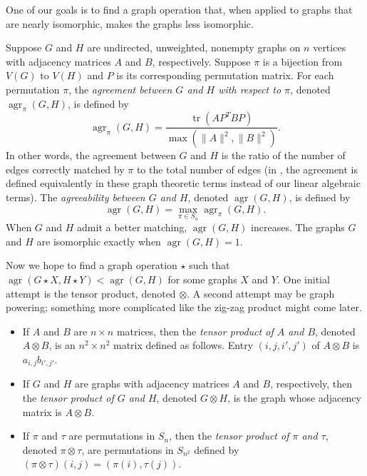 \documentclass{article}
\newcommand{\1}{\mathbf{1}}
\DeclareMathOperator{\tr}{tr}
\DeclareMathOperator{\agr}{agr}
\begin{document}
One of our goals is to find a graph operation that, when applied to graphs that are nearly isomorphic, makes the graphs less isomorphic.

Suppose $G$ and $H$ are undirected, unweighted, nonempty graphs on $n$ vertices with adjacency matrices $A$ and $B$, respectively.
Suppose $\pi$ is a bijection from $V(G)$ to $V(H)$ and $P$ is its corresponding permutation matrix.
For each permutation $\pi$, the \emph{agreement between $G$ and $H$ with respect to $\pi$}, denoted $\agr_\pi(G, H)$, is defined by
\begin{equation*}
  \agr_\pi(G, H) = \frac{\tr(AP^TBP)}{\max(\|A\|^2, \|B\|^2)}.
\end{equation*}
In other words, the agreement between $G$ and $H$ is the ratio of the number of edges correctly matched by $\pi$ to the total number of edges (in \autocite{owwz14}, the agreement is defined equivalently in these graph theoretic terms instead of our linear algebraic terms).
The \emph{agreeability between $G$ and $H$}, denoted $\agr(G, H)$, is defined by
\begin{equation*}
  \agr(G, H) = \max_{\pi \in S_n} \agr_\pi(G, H).
\end{equation*}
When $G$ and $H$ admit a better matching, $\agr(G, H)$ increases.
The graphs $G$ and $H$ are isomorphic exactly when $\agr(G, H) = 1$.

Now we hope to find a graph operation $\star$ such that $\agr(G \star X, H \star Y) < \agr(G, H)$ for some graphs $X$ and $Y$.
One initial attempt is the tensor product, denoted $\otimes$.
A second attempt may be graph powering; something more complicated like the zig-zag product might come later.

\begin{definition}
  \mbox{}
  \begin{itemize}
  \item
    If $A$ and $B$ are $n \times n$ matrices, then the \emph{tensor product of $A$ and $B$}, denoted $A \otimes B$, is an $n^2 \times n^2$ matrix defined as follows.
    Entry $(i, j, i', j')$ of $A \otimes B$ is $a_{i, j} b_{i', j'}$.
  \item If $G$ and $H$ are graphs with adjacency matrices $A$ and $B$, respectively, then the \emph{tensor product of $G$ and $H$}, denoted $G \otimes H$, is the graph whose adjacency matrix is $A \otimes B$.
  \item If $\pi$ and $\tau$ are permutations in $S_n$, then the \emph{tensor product of $\pi$ and $\tau$}, denoted $\pi \otimes \tau$, are permutations in $S_{n^2}$ defined by $(\pi \otimes \tau)(i, j) = (\pi(i), \tau(j))$.
  \end{itemize}
\end{definition}
\end{document}
